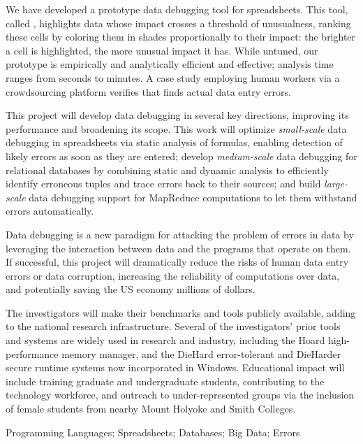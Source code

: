 We have developed a prototype data debugging tool
for spreadsheets. This tool, called
\checkcell{},
 highlights data whose impact crosses a threshold of unusualness,
ranking these cells by coloring them in shades proportionally to their
impact: the brighter a cell is highlighted, the more unusual impact it
has.  While untuned, our prototype is empirically and analytically
efficient and effective; analysis time ranges from seconds to minutes.
A case study employing human workers via a crowdsourcing platform
verifies that \checkcell{} finds actual data entry errors.

This project will develop data debugging in several key directions,
improving its performance and broadening its scope. This work will
optimize \emph{small-scale} data debugging in spreadsheets via static
analysis of formulas, enabling detection of likely errors as soon as
they are entered; develop \emph{medium-scale} data debugging for
relational databases by combining static and dynamic analysis to
efficiently identify erroneous tuples and trace errors back to their
sources; and build \emph{large-scale} data debugging support for MapReduce
computations to let them withstand errors automatically.


\smallskip
{}
Data debugging is a new paradigm for attacking the problem of errors
in data by leveraging the interaction between data and the programs
that operate on them.  If successful, this project will dramatically
reduce the risks of human data entry errors or data corruption,
increasing the reliability of computations over data, and potentially
saving the US economy millions of dollars.

The investigators will make their benchmarks and tools publicly
available, adding to the national research infrastructure. Several of
the investigators' prior tools and systems are widely used in research
and industry, including the Hoard high-performance memory manager, and the
DieHard error-tolerant and DieHarder secure runtime systems now
incorporated in Windows. Educational impact will include training
graduate and undergraduate students, contributing to the technology
workforce, and outreach to under-represented groups via the inclusion
of female students from nearby Mount Holyoke and Smith Colleges.

\smallskip
{} Programming Languages; Spreadsheets; Databases; Big Data; Errors
